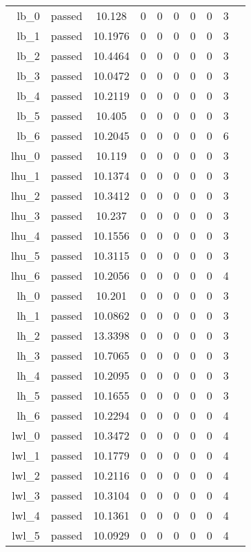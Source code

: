 \begin{longtable}{r|ccccccccc}
    lb\_0 & passed & 10.128 & 0 & 0 & 0 & 0 & 0 & 3 \\
    lb\_1 & passed & 10.1976 & 0 & 0 & 0 & 0 & 0 & 3 \\
    lb\_2 & passed & 10.4464 & 0 & 0 & 0 & 0 & 0 & 3 \\
    lb\_3 & passed & 10.0472 & 0 & 0 & 0 & 0 & 0 & 3 \\
    lb\_4 & passed & 10.2119 & 0 & 0 & 0 & 0 & 0 & 3 \\
    lb\_5 & passed & 10.405 & 0 & 0 & 0 & 0 & 0 & 3 \\
    lb\_6 & passed & 10.2045 & 0 & 0 & 0 & 0 & 0 & 6 \\
    lhu\_0 & passed & 10.119 & 0 & 0 & 0 & 0 & 0 & 3 \\
    lhu\_1 & passed & 10.1374 & 0 & 0 & 0 & 0 & 0 & 3 \\
    lhu\_2 & passed & 10.3412 & 0 & 0 & 0 & 0 & 0 & 3 \\
    lhu\_3 & passed & 10.237 & 0 & 0 & 0 & 0 & 0 & 3 \\
    lhu\_4 & passed & 10.1556 & 0 & 0 & 0 & 0 & 0 & 3 \\
    lhu\_5 & passed & 10.3115 & 0 & 0 & 0 & 0 & 0 & 3 \\
    lhu\_6 & passed & 10.2056 & 0 & 0 & 0 & 0 & 0 & 4 \\
    lh\_0 & passed & 10.201 & 0 & 0 & 0 & 0 & 0 & 3 \\
    lh\_1 & passed & 10.0862 & 0 & 0 & 0 & 0 & 0 & 3 \\
    lh\_2 & passed & 13.3398 & 0 & 0 & 0 & 0 & 0 & 3 \\
    lh\_3 & passed & 10.7065 & 0 & 0 & 0 & 0 & 0 & 3 \\
    lh\_4 & passed & 10.2095 & 0 & 0 & 0 & 0 & 0 & 3 \\
    lh\_5 & passed & 10.1655 & 0 & 0 & 0 & 0 & 0 & 3 \\
    lh\_6 & passed & 10.2294 & 0 & 0 & 0 & 0 & 0 & 4 \\
    lwl\_0 & passed & 10.3472 & 0 & 0 & 0 & 0 & 0 & 4 \\
    lwl\_1 & passed & 10.1779 & 0 & 0 & 0 & 0 & 0 & 4 \\
    lwl\_2 & passed & 10.2116 & 0 & 0 & 0 & 0 & 0 & 4 \\
    lwl\_3 & passed & 10.3104 & 0 & 0 & 0 & 0 & 0 & 4 \\
    lwl\_4 & passed & 10.1361 & 0 & 0 & 0 & 0 & 0 & 4 \\
    lwl\_5 & passed & 10.0929 & 0 & 0 & 0 & 0 & 0 & 4 \\

\end{longtable}

